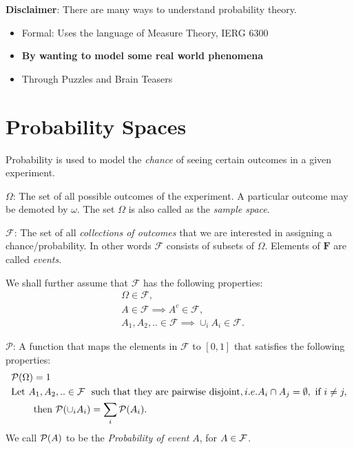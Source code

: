 
\textbf{Disclaimer}: There are many ways to understand probability theory.
\begin{itemize}
    \item Formal: Uses the language of Measure Theory, IERG 6300
    \item \textbf{By wanting to model some real world phenomena}
    \item Through Puzzles and Brain Teasers
\end{itemize}

%

\section{Probability Spaces}
 Probability is used to model the \textit{chance} of seeing certain outcomes in a given experiment.

 \textbf{$\Omega$}: The set of all possible outcomes of the experiment. A particular outcome may be demoted by $\omega$. The set $\Omega$ is also called as the \textit{sample space}.

 \textbf{$\mathcal{F}$}: The set of all \textit{collections of outcomes} that we are interested in assigning a chance/probability. In other words $\mathcal{F}$ consists of subsets of $\Omega$. Elements of $\mathbf{F}$ are called \textit{events}.

 We shall further assume that $\mathcal{F}$ has the following properties:
 \begin{align}
     &\Omega \in \mathcal{F}, \nonumber\\
     &A \in \mathcal{F} \implies  A^c \in \mathcal{F} \label{eq:sigma},\\
     &A_1,A_2,..  \in \mathcal{F} \implies \cup_i A_i \in \mathcal{F}. \nonumber
 \end{align}

 $\mathcal{P}$: A function that maps the elements in $\mathcal{F}$ to $[0,1]$ that satisfies the following properties:
 \begin{align}
      &\mathcal{P}(\Omega)=1 \label{eq:prob} \\
      &\mbox{Let}~ A_1,A_2,..  \in \mathcal{F} ~ \mbox{ such that they are pairwise disjoint}, i.e. A_i \cap A_j = \emptyset, ~ \mbox{if}~ i \neq j,  \nonumber \\
      & \qquad  ~ \mbox{then}~ \mathcal{P}(\cup_i A_i) = \sum_i \mathcal{P}(A_i). \nonumber
 \end{align}
 We call $\mathcal{P}(A)$ to be the \textit{Probability of event} $A$, for $A \in \mathcal{F}$.


